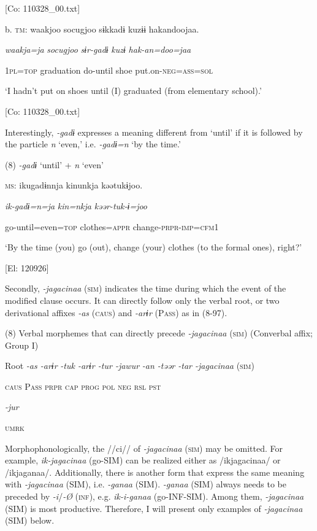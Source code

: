       [Co: 110328\_00.txt]

  b.  \textsc{tm}:  waakjoo  {\textbar}socugjoo{\textbar}  sɨkkadɨ  kuzɨɨ  hakandoojaa.

      \textit{waakja=ja}  \textit{socugjoo}  \textit{sɨr-gadɨ}  \textit{kuzɨ}  \textit{hak-an=doo=jaa}

      1\textsc{pl}=\textsc{top}  graduation  do-until  shoe  put.on-\textsc{neg}=\textsc{ass}=\textsc{sol}

      ‘I hadn’t put on shoes until (I) graduated (from elementary school).’

      [Co: 110328\_00.txt]

Interestingly, \textit{{}-gadɨ} expresses a meaning different from ‘until’ if it is followed by the particle \textit{n} ‘even,’ i.e. \textit{{}-gadɨ=n} ‘by the time.’

(8)  \textit{{}-gadɨ} ‘until’ + \textit{n} ‘even’

  \textsc{ms}:  ikugadɨnnja  kinunkja  kəətukɨjoo.

    \textit{ik-gadɨ=n=ja}  \textit{kin=nkja}  \textit{kəər-tuk-ɨ=joo}

    go-until=even=\textsc{top}  clothes=\textsc{appr}  change-\textsc{prpr}-\textsc{imp}=\textsc{cfm}1

    ‘By the time (you) go (out), change (your) clothes (to the formal ones), right?’

    [El: 120926]

  Secondly, \textit{{}-jagacinaa} (\textsc{sim}) indicates the time during which the event of the modified clause occurs. It can directly follow only the verbal root, or two derivational affixes \textit{{}-as} (\textsc{caus}) and \textit{{}-arɨr} (P\textsc{ass}) as in (8-97).

(8)  Verbal morphemes that can directly precede \textit{{}-jagacinaa} (\textsc{sim}) (Converbal affix; Group I)

  Root  \textit{{}-as  {}-arɨr} %
\textit{{}-tuk  {}-arɨr  {}-tur  {}-jawur} %
\textit{{}-an  {}-təər  {}-tar  {}-jagacinaa} (\textsc{sim})

    \textsc{caus}  P\textsc{ass}  \textsc{prpr}  \textsc{cap}  \textsc{prog}  \textsc{pol}  \textsc{neg}  \textsc{rsl}  \textsc{pst}

          \textit{{}-jur} 

          \textsc{umrk}

Morphophonologically, the //ci// of \textit{{}-jagacinaa} (\textsc{sim}) may be omitted. For example, \textit{ik-jagacinaa} (go-SIM) can be realized either as /ikjagacinaa/ or /ikjaganaa/. Additionally, there is another form that express the same meaning with \textit{{}-jagacinaa} (SIM), i.e. \textit{{}-ganaa} (SIM). \textit{{}-ganaa} (SIM) always needs to be preceded by \textit{{}-i}/\textit{{}-Ø} (\textsc{inf}), e.g. \textit{ik-i-ganaa} (go-INF-SIM). Among them, \textit{{}-jagacinaa} (SIM) is most productive. Therefore, I will present only examples of \textit{{}-jagacinaa} (SIM) below.

